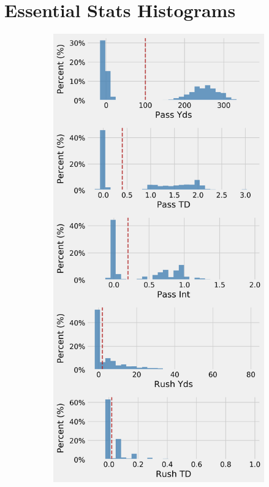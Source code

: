 \documentclass[12pt]{article}
\begin{document}
\pagebreak
\section{Essential Stats Histograms}

\begin{figure}[H]
  \centering
  \begin{subfigure}[b]{0.450\textwidth}
    \centering
    \includegraphics[width=1\textwidth]{../figures/no_threshold_hist_QB}

\end{subfigure}
\end{figure}
\end{document}
